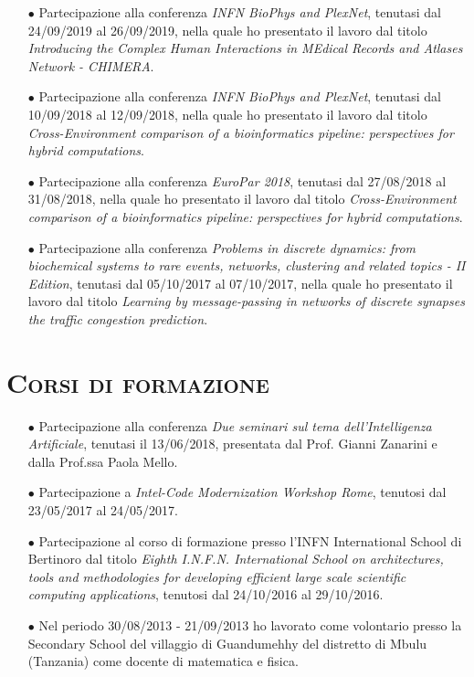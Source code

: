 \documentclass[a4paper,11pt]{article}
\begin{document}
\begin{itemize}

  \item[$\bullet$] Partecipazione alla conferenza \emph{INFN BioPhys and PlexNet}, tenutasi dal 24/09/2019 al 26/09/2019, nella quale ho presentato il lavoro dal titolo \emph{Introducing the Complex Human Interactions in MEdical Records and Atlases Network - CHIMERA}.

  \item[$\bullet$] Partecipazione alla conferenza \emph{INFN BioPhys and PlexNet}, tenutasi dal 10/09/2018 al 12/09/2018, nella quale ho presentato il lavoro dal titolo \emph{Cross-Environment comparison of a bioinformatics pipeline: perspectives for hybrid computations}.

  \item[$\bullet$] Partecipazione alla conferenza \emph{EuroPar 2018}, tenutasi dal 27/08/2018 al 31/08/2018, nella quale ho presentato il lavoro dal titolo \emph{Cross-Environment comparison of a bioinformatics pipeline: perspectives for hybrid computations}.

  \item[$\bullet$] Partecipazione alla conferenza \emph{Problems in discrete dynamics: from biochemical systems to rare events, networks, clustering and related topics - II Edition}, tenutasi dal 05/10/2017 al 07/10/2017, nella quale ho presentato il lavoro dal titolo \emph{Learning by message-passing in networks of discrete synapses the traffic congestion prediction}.

\end{itemize}


\vspace*{0.5cm}
\section*{\scshape{Corsi di formazione}}

\begin{itemize}

  \item[$\bullet$] Partecipazione alla conferenza \emph{Due seminari sul tema dell'Intelligenza Artificiale}, tenutasi il 13/06/2018, presentata dal Prof. Gianni Zanarini e dalla Prof.ssa Paola Mello.

  \item[$\bullet$] Partecipazione a \emph{Intel-Code Modernization Workshop Rome}, tenutosi dal 23/05/2017 al 24/05/2017.

  \item[$\bullet$] Partecipazione al corso di formazione presso l'INFN International School di Bertinoro dal titolo \emph{Eighth I.N.F.N. International School on architectures, tools and methodologies for developing efficient large scale scientific computing applications}, tenutosi dal 24/10/2016 al 29/10/2016.

  \item[$\bullet$] Nel periodo 30/08/2013 - 21/09/2013 ho lavorato come volontario presso la Secondary School del villaggio di Guandumehhy del distretto di Mbulu (Tanzania) come docente di matematica e fisica.

\end{itemize}
\end{document}
